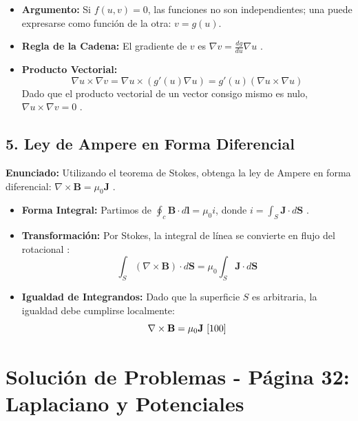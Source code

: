 \documentclass[a4paper]{article}
\begin{document}
\begin{itemize}
    \item \textbf{Argumento:} Si $f(u, v) = 0$, las funciones no son independientes; una puede expresarse como función de la otra: $v = g(u)$.
    \item \textbf{Regla de la Cadena:} El gradiente de $v$ es $\nabla v = \frac{dg}{du} \nabla u$ \cite{82}.
    \item \textbf{Producto Vectorial:}
    \begin{equation*}
        \nabla u \times \nabla v = \nabla u \times (g'(u) \nabla u) = g'(u) (\nabla u \times \nabla u)
    \end{equation*}
    Dado que el producto vectorial de un vector consigo mismo es nulo, $\nabla u \times \nabla v = 0$ \cite{99}.
\end{itemize}

\subsection*{5. Ley de Ampere en Forma Diferencial}
\textbf{Enunciado:} Utilizando el teorema de Stokes, obtenga la ley de Ampere en forma diferencial: $\nabla \times \mathbf{B} = \mu_0 \mathbf{J}$ \cite{100}.

\begin{itemize}
    \item \textbf{Forma Integral:} Partimos de $\oint_c \mathbf{B} \cdot d\mathbf{l} = \mu_0 i$, donde $i = \int_S \mathbf{J} \cdot d\mathbf{S}$ \cite{100}.
    \item \textbf{Transformación:} Por Stokes, la integral de línea se convierte en flujo del rotacional \cite{97}:
    \begin{equation*}
        \int_S (\nabla \times \mathbf{B}) \cdot d\mathbf{S} = \mu_0 \int_S \mathbf{J} \cdot d\mathbf{S}
    \end{equation*}
    \item \textbf{Igualdad de Integrandos:} Dado que la superficie $S$ es arbitraria, la igualdad debe cumplirse localmente:
    \begin{equation*}
        \nabla \times \mathbf{B} = \mu_0 \mathbf{J} \text{ \cite{100}}
    \end{equation*}
\end{itemize}


\section*{Solución de Problemas - Página 32: Laplaciano y Potenciales}
\end{document}
